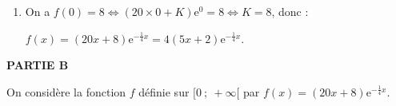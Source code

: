 \documentclass[10pt]{article}
\providecommand{\R}{\mathbb{R}}
\providecommand{\e}{{\mathrm{e}}}
\begin{document}
\begin{enumerate}
$f'(x) + \dfrac14f(x) = 20\e^{- \frac14 x}$ ou d'après la question 1. :

$f'(x) + \dfrac14f(x) = g'(x) + \dfrac14g(x) \iff f'(x) - g'(x) = \dfrac14[f(x) - g(x)]$ soit par linéarité de la dérivation :

$(f - g)'(x) + \dfrac14[(f - g ](x) = 0$ : ceci signifie que la fonction $f - g$ est solution de $(E')$ c'est-à)dire que 

$f(x) - g(x) = K\e^{-\frac14 x} \iff f(x) = K\e^{-\frac14 x} + g(x)$ ou enfin 
$f(x) = K\e^{-\frac14 x} + 20x\e^{-\frac14 x}\iff f(x) = (20x + K)\e^{-\frac14 x}$, avec $K \in \R$.

Les solutions de $(E)$ sur l'intervalle $[0~;~ +\infty[$ sont donc les fonctions $f$ définies par:\\
$f(x) = \e^{-\frac14 x}(20x + K)$, avec  $K \in \R$.

\item 
On a $f(0) = 8 \iff (20 \times 0 + K)\e^{0} = 8 \iff K = 8$, donc :

$f(x) = (20x + 8)\e^{-\frac14 x} = 4\left (5x + 2\right )\e^{-\frac14 x}$.
\end{enumerate}

\bigskip

\textbf{PARTIE B}

\medskip

On considère la fonction $f$ définie sur $[0~;~ +\infty[$ par 
$f(x) = (20x + 8)\e^{-\frac14 x}$.
\end{document}
